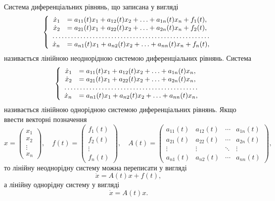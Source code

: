 Система диференціальних рівнянь, що записана у вигляді
\begin{equation*}
	\left\{
		\begin{array}{rl}
			\dot x_1 &= a_{11}(t) x_1 + a_{12}(t) x_2 + \ldots + a_{1n}(t) x_n + f_1(t), \\
			\dot x_2 &= a_{21}(t) x_1 + a_{22}(t) x_2 + \ldots + a_{2n}(t) x_n + f_2(t), \\
			\hdotsfor{2} \\
			\dot x_n &= a_{n1}(t) x_1 + a_{n2}(t) x_2 + \ldots + a_{nn}(t) x_n + f_n(t),
		\end{array}
	\right.
\end{equation*}
називається лінійною неоднорідною системою диференціальних рівнянь. Система 
\begin{equation*}
	\left\{
		\begin{array}{rl}
			\dot x_1 &= a_{11}(t) x_1 + a_{12}(t) x_2 + \ldots + a_{1n}(t) x_n, \\
			\dot x_2 &= a_{21}(t) x_1 + a_{22}(t) x_2 + \ldots + a_{2n}(t) x_n, \\
			\hdotsfor{2} \\
			\dot x_n &= a_{n1}(t) x_1 + a_{n2}(t) x_2 + \ldots + a_{nn}(t) x_n,
		\end{array}
	\right.
\end{equation*}
називається лінійною однорідною системою диференціальних рівнянь. Якщо ввести векторні позначення
\begin{equation*}
	x = \begin{pmatrix} x_1 \\ x_2 \\ \vdots \\ x_n \end{pmatrix}, \quad 
	f(t) = \begin{pmatrix} f_1(t) \\ f_2(t) \\ \vdots \\ f_n(t) \end{pmatrix}, \quad
	A(t) = \begin{pmatrix} a_{11}(t) & a_{12}(t) & \cdots & a_{1n}(t) \\ a_{21}(t) & a_{22}(t) & \cdots & a_{2n}(t) \\ \vdots & \vdots & \ddots & \vdots \\ a_{n1}(t) & a_{n2}(t) & \cdots & a_{nn}(t) \end{pmatrix},
\end{equation*}
то лінійну неоднорідну систему можна переписати у вигляді
\begin{equation*}
	\dot x = A(t) x + f(t),
\end{equation*}
а лінійну однорідну систему у вигляді
\begin{equation*}
	\dot x = A(t) x.
\end{equation*}

